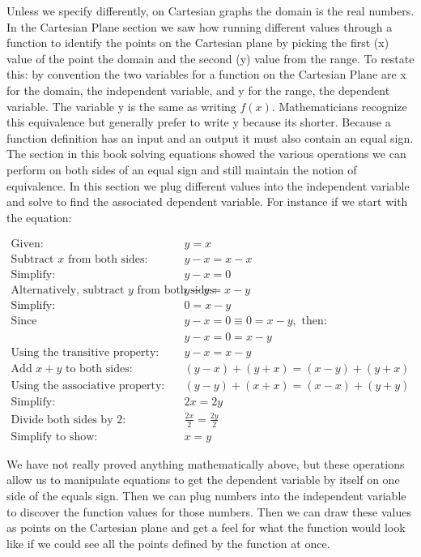 Unless we specify differently, on Cartesian graphs the domain is the real numbers. In the
Cartesian Plane section we saw how running different values through a function to identify
the points on the Cartesian plane by picking the first (x) value of the point the domain
and the second (y) value from the range. To restate this: by convention the two variables
for a function on the Cartesian Plane are x for the domain, the independent variable, and
y for the range, the dependent variable. The variable y is the same as writing $f(x)$.
Mathematicians recognize this equivalence but generally prefer to write y because its
shorter. Because a function definition has an input and an output it must also contain an
equal sign. The section in this book solving equations showed the various operations we
can perform on both sides of an equal sign and still maintain the notion of equivalence.
In this section we plug different values into the independent variable and solve to find
the associated dependent variable. For instance if we start with the equation:



\begin{align}
\text{Given: } & y = x \\ 
\text{Subtract } x \text{ from both sides: } & y - x = x - x \\ 
\text{Simplify: } & y - x = 0 \\ 
\text{Alternatively, subtract } y \text{ from both sides: } & y - y = x - y \\ 
\text{Simplify: } & 0 = x - y \\ 
\text{Since } & y - x = 0 \equiv 0 = x - y, \text{ then: } \\ 
& y - x = 0 = x - y \\ 
\text{Using the transitive property: } & y - x = x - y \\ 
\text{Add } x + y \text{ to both sides: } & (y - x) + (y + x) = (x - y) + (y + x) \\ 
\text{Using the associative property: } & (y - y) + (x + x) = (x - x) + (y + y) \\ 
\text{Simplify: } & 2x = 2y \\ 
\text{Divide both sides by 2: } & \frac{2x}{2} = \frac{2y}{2} \\ 
\text{Simplify to show: } & x = y
\end{align}



We have not really proved anything mathematically above, but these operations allow us to
manipulate equations to get the dependent variable by itself on one side of the equals
sign. Then we can plug numbers into the independent variable to discover the function
values for those numbers. Then we can draw these values as points on the Cartesian plane
and get a feel for what the function would look like if we could see all the points
defined by the function at once.




